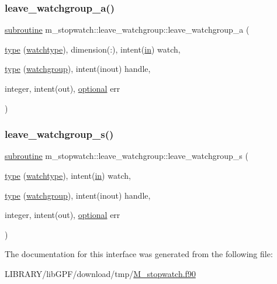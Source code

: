 \subsubsection{\texorpdfstring{leave\+\_\+watchgroup\+\_\+a()}{leave\_watchgroup\_a()}}
{\footnotesize\ttfamily \hyperlink{M__stopwatch_83_8txt_acfbcff50169d691ff02d4a123ed70482}{subroutine} m\+\_\+stopwatch\+::leave\+\_\+watchgroup\+::leave\+\_\+watchgroup\+\_\+a (\begin{DoxyParamCaption}\item[{\hyperlink{stop__watch_83_8txt_a70f0ead91c32e25323c03265aa302c1c}{type} (\hyperlink{structm__stopwatch_1_1watchtype}{watchtype}), dimension(\+:), intent(\hyperlink{M__journal_83_8txt_afce72651d1eed785a2132bee863b2f38}{in})}]{watch,  }\item[{\hyperlink{stop__watch_83_8txt_a70f0ead91c32e25323c03265aa302c1c}{type} (\hyperlink{structm__stopwatch_1_1watchgroup}{watchgroup}), intent(inout)}]{handle,  }\item[{integer, intent(out), \hyperlink{option__stopwatch_83_8txt_aa4ece75e7acf58a4843f70fe18c3ade5}{optional}}]{err }\end{DoxyParamCaption})\hspace{0.3cm}{\ttfamily [private]}}

\mbox{\label{interfacem__stopwatch_1_1leave__watchgroup_aeb899a166591374378bbc81cf1e486f5}} 
\subsubsection{\texorpdfstring{leave\+\_\+watchgroup\+\_\+s()}{leave\_watchgroup\_s()}}
{\footnotesize\ttfamily \hyperlink{M__stopwatch_83_8txt_acfbcff50169d691ff02d4a123ed70482}{subroutine} m\+\_\+stopwatch\+::leave\+\_\+watchgroup\+::leave\+\_\+watchgroup\+\_\+s (\begin{DoxyParamCaption}\item[{\hyperlink{stop__watch_83_8txt_a70f0ead91c32e25323c03265aa302c1c}{type} (\hyperlink{structm__stopwatch_1_1watchtype}{watchtype}), intent(\hyperlink{M__journal_83_8txt_afce72651d1eed785a2132bee863b2f38}{in})}]{watch,  }\item[{\hyperlink{stop__watch_83_8txt_a70f0ead91c32e25323c03265aa302c1c}{type} (\hyperlink{structm__stopwatch_1_1watchgroup}{watchgroup}), intent(inout)}]{handle,  }\item[{integer, intent(out), \hyperlink{option__stopwatch_83_8txt_aa4ece75e7acf58a4843f70fe18c3ade5}{optional}}]{err }\end{DoxyParamCaption})\hspace{0.3cm}{\ttfamily [private]}}



The documentation for this interface was generated from the following file\+:\begin{DoxyCompactItemize}
\item 
L\+I\+B\+R\+A\+R\+Y/lib\+G\+P\+F/download/tmp/\hyperlink{M__stopwatch_8f90}{M\+\_\+stopwatch.\+f90}\end{DoxyCompactItemize}
